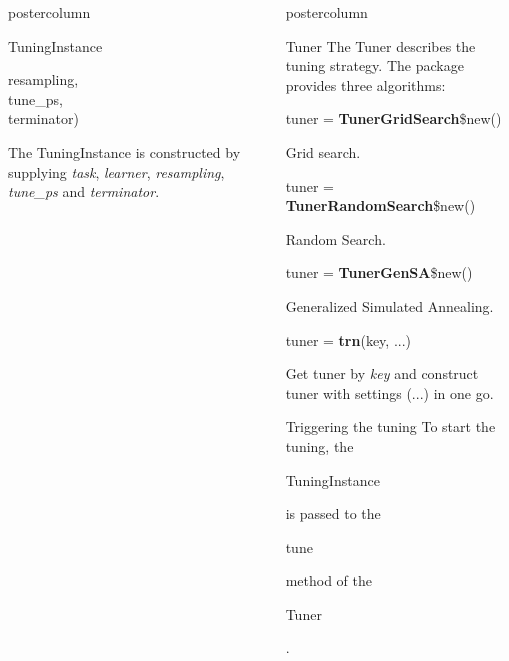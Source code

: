 \documentclass{beamer}
\newlength{\columnheight} %
\newcommand{\codeinline}[1]{\begin{codeboxinline}#1\end{codeboxinline}}
\begin{document}
\begin{frame}[fragile]{}
\begin{columns}
\begin{column}{.245\textwidth}
\begin{beamercolorbox}[center]{postercolumn}
\begin{minipage}{.98\textwidth}
{\begin{myblock}{TuningInstance}
\begin{codeboxmultiline}[width=18cm]
						\hspace*{1ex}resampling,\\
						\hspace*{1ex}tune\_ps,\\
						\hspace*{1ex}terminator)
					\end{codeboxmultiline}
					The TuningInstance is constructed by supplying \textit{task}, \textit{learner}, \textit{resampling}, \textit{tune\_ps} and \textit{terminator}. 
					\\
				\end{myblock}	
					\vfill}
				\end{minipage}
			\end{beamercolorbox}
		\end{column}
		\begin{column}{.245\textwidth}
			\begin{beamercolorbox}[center]{postercolumn}
				\begin{minipage}{.98\textwidth}
					\parbox[t][\columnheight]{\textwidth}{
						\begin{myblock}{Tuner}
							The Tuner describes the tuning strategy. The package provides three algorithms:
							\\
							\begin{codebox}
								tuner = \textbf{TunerGridSearch}\$new()
							\end{codebox}
							Grid search.
							\\
							\begin{codebox}
								tuner = \textbf{TunerRandomSearch}\$new()
							\end{codebox}
							Random Search.
							\\
							\begin{codebox}
								tuner = \textbf{TunerGenSA}\$new()
							\end{codebox}
							Generalized Simulated Annealing.
							\\
							\begin{codebox}
								tuner = \textbf{trn}(key, ...)
							\end{codebox}
							Get tuner by \textit{key} and construct tuner with settings (...) in one go.
						\end{myblock}
						\begin{myblock}{Triggering the tuning}
							To start the tuning, the \codeinline{TuningInstance} is passed to the \codeinline{tune} method of the \codeinline{Tuner}.
							\\

\end{myblock}}
\end{minipage}
\end{beamercolorbox}
\end{column}
\end{columns}
\end{frame}
\end{document}
